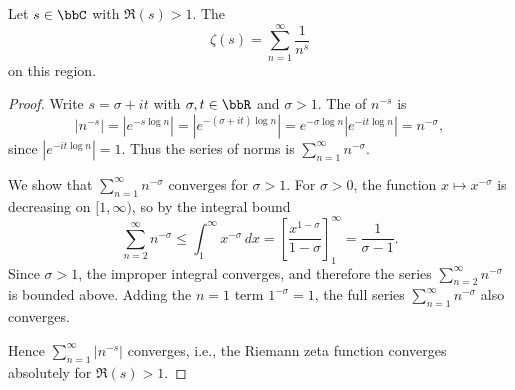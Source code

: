 \begin{lemma} \label{lemma:riemann_zeta_function_converges_absolutely_on_the_right_half_plane_with_real_part_greater_than_one}
    Let $s \in \bbC$ with $\Re(s) > 1$. The 
    $$\zeta(s) = \sum_{n=1}^\infty \frac{1}{n^s}$$
     on this region.
\end{lemma}
\begin{proof}
    Write $s = \sigma + it$ with $\sigma, t \in \bbR$ and $\sigma > 1$. The  of $n^{-s}$ is
    $$|n^{-s}| = |e^{-s \log n}| = |e^{-(\sigma + it) \log n}| = e^{-\sigma \log n} |e^{-it \log n}| = n^{-\sigma},$$
    since $|e^{-it \log n}| = 1$. Thus the series of norms is $\sum_{n=1}^\infty n^{-\sigma}$.

    We show that $\sum_{n=1}^\infty n^{-\sigma}$ converges for $\sigma > 1$. For $\sigma > 0$, the function $x \mapsto x^{-\sigma}$ is decreasing on $[1, \infty)$, so by the integral bound
    $$\sum_{n=2}^\infty n^{-\sigma} \leq \int_1^\infty x^{-\sigma}\,dx = \left[\frac{x^{1-\sigma}}{1-\sigma}\right]_1^\infty = \frac{1}{\sigma-1}.$$
    Since $\sigma > 1$, the improper integral converges, and therefore the series $\sum_{n=2}^\infty n^{-\sigma}$ is bounded above. Adding the $n=1$ term $1^{-\sigma}=1$, the full series $\sum_{n=1}^\infty n^{-\sigma}$ also converges.

    Hence $\sum_{n=1}^\infty |n^{-s}|$ converges, i.e., the Riemann zeta function converges absolutely for $\Re(s) > 1$.
\end{proof}